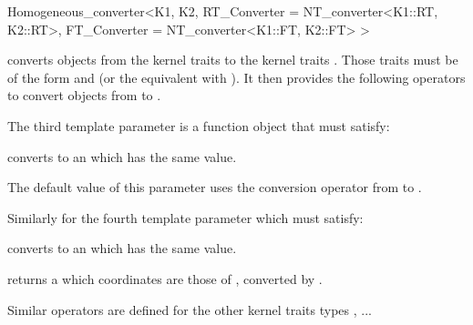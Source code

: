\begin{ccRefClass}{Homogeneous_converter<K1, K2,
                             RT_Converter = NT_converter<K1::RT, K2::RT>,
                             FT_Converter = NT_converter<K1::FT, K2::FT> >}

\KernelRefLayout\gdef\ccTagOperatorLayout{\ccFalse}

\ccDefinition

\ccClassTemplateName converts objects from the kernel traits  to
the kernel traits .  Those traits must be of the form
 and  (or the equivalent with
).  It then provides the following operators to
convert objects from  to .


\ccTypes

The third template parameter  is a function object that must
satisfy:

{ converts  to an  which has the same value.}

The default value of this parameter uses the conversion operator from
 to .

Similarly for the fourth template parameter which must satisfy:

{ converts  to an  which has the same value.}

\ccCreation
{}


\ccOperations

{ returns a  which coordinates are those of ,
converted by .}

Similar operators are defined for the other kernel traits types ,
...


\end{ccRefClass}

